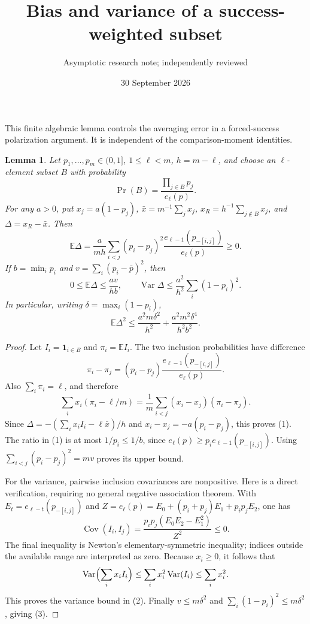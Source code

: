 \documentclass[11pt]{article}
\title{Bias and variance of a success-weighted subset}
\author{Asymptotic research note; independently reviewed}
\date{30 September 2026}
\newtheorem{lemma}{Lemma}
\newcommand{\E}{\mathbb E}
\newcommand{\Var}{\operatorname{Var}}
\begin{document}
\maketitle
This finite algebraic lemma controls the averaging error in a
forced-success polarization argument. It is independent of the
comparison-moment identities.

\begin{lemma}\label{main}
Let $p_1,\ldots,p_m\in(0,1]$, $1\le\ell<m$, $h=m-\ell$, and
choose an $\ell$-element subset $B$ with probability
\[
 \Pr(B)=\frac{\prod_{j\in B}p_j}{e_\ell(p)}.
\]
For any $a>0$, put $x_j=a(1-p_j)$, $\bar x=m^{-1}\sum_jx_j$,
$x_R=h^{-1}\sum_{j\notin B}x_j$, and $\Delta=x_R-\bar x$.
Then
\[
 \E\Delta=\frac{a}{mh}\sum_{i<j}(p_i-p_j)^2
       \frac{e_{\ell-1}(p_{-[i,j]})}{e_\ell(p)}\ge0.       \tag{1}
\]
If $b=\min_i p_i$ and $v=\sum_i(p_i-\bar p)^2$, then
\[
 0\le\E\Delta\le\frac{a v}{h b},\qquad
 \Var\Delta\le\frac{a^2}{h^2}\sum_i(1-p_i)^2.             \tag{2}
\]
In particular, writing $\delta=\max_i(1-p_i)$,
\[
 \E\Delta^2\le\frac{a^2m\delta^2}{h^2}
                 +\frac{a^2m^2\delta^4}{h^2b^2}.          \tag{3}
\]
\end{lemma}
\begin{proof}
Let $I_i=\boldsymbol1_{i\in B}$ and $\pi_i=\E I_i$.
The two inclusion probabilities have difference
\[
 \pi_i-\pi_j=(p_i-p_j)
       \frac{e_{\ell-1}(p_{-[i,j]})}{e_\ell(p)}.
\]
Also $\sum_i\pi_i=\ell$, and therefore
\[
 \sum_i x_i(\pi_i-\ell/m)
   =\frac1m\sum_{i<j}(x_i-x_j)(\pi_i-\pi_j).
\]
Since $\Delta=-(\sum_i x_i I_i-\ell\bar x)/h$ and
$x_i-x_j=-a(p_i-p_j)$, this proves (1).
The ratio in (1) is at most $1/p_i\le1/b$, since
$e_\ell(p)\ge p_i e_{\ell-1}(p_{-[i,j]})$.
Using $\sum_{i<j}(p_i-p_j)^2=mv$ proves its upper bound.

For the variance, pairwise inclusion covariances are nonpositive.
Here is a direct verification, requiring no general negative
association theorem. With $E_t=e_{\ell-t}(p_{-[i,j]})$ and
$Z=e_\ell(p)=E_0+(p_i+p_j)E_1+p_ip_jE_2$, one has
\[
 \operatorname{Cov}(I_i,I_j)
   =\frac{p_ip_j(E_0E_2-E_1^2)}{Z^2}\le0.
\]
The final inequality is Newton's elementary-symmetric inequality;
indices outside the available range are interpreted as zero.
Because $x_i\ge0$, it follows that
\[
 \Var\Bigl(\sum_i x_i I_i\Bigr)
 \le\sum_i x_i^2\Var(I_i)\le\sum_i x_i^2.
\]
This proves the variance bound in (2). Finally $v\le m\delta^2$
and $\sum_i(1-p_i)^2\le m\delta^2$, giving (3).
\end{proof}
\end{document}
